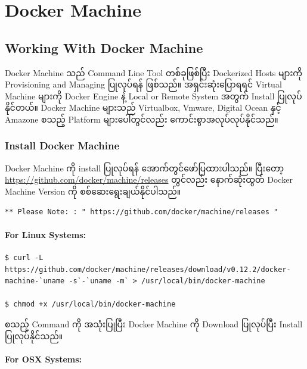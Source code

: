 \hypertarget{docker-machine}{%
\section{Docker Machine}\label{docker-machine}}

\hypertarget{working-with-docker-machine}{%
\subsection{Working With Docker
Machine}\label{working-with-docker-machine}}

Docker Machine သည် Command Line Tool တစ်ခုဖြစ်ပြီး Dockerized Hosts
များကို Provisioning and Managing ပြုလုပ်ရန် ဖြစ်သည်။ အရှင်းဆုံးပြောရရင်
Virtual Machine များကို Docker Engine နဲ့ Local or Remote System အတွက်
Install ပြုလုပ်နိုင်တယ်။ Docker Machine များသည် Virtualbox, Vmware,
Digital Ocean နှင့် Amazone စသည့် Platform များပေါ်တွင်လည်း
ကောင်းစွာအလုပ်လုပ်နိုင်သည်။

\hypertarget{install-docker-machine}{%
\subsubsection{Install Docker Machine}\label{install-docker-machine}}

Docker Machine ကို install ပြုလုပ်ရန် အောက်တွင်ဖော်ပြထားပါသည်။ ပြီးတော့
\url{https://github.com/docker/machine/releases} တွင်လည်း နောက်ဆုံးထွတ်
Docker Machine Version ကို စစ်ဆေးရွေးချယ်နိုင်ပါသည်။

\begin{verbatim}
** Please Note: : " https://github.com/docker/machine/releases " 
\end{verbatim}

\hypertarget{for-linux-systems}{%
\paragraph{For Linux Systems:}\label{for-linux-systems}}

\begin{verbatim}
$ curl -L https://github.com/docker/machine/releases/download/v0.12.2/docker-machine-`uname -s`-`uname -m` > /usr/local/bin/docker-machine

$ chmod +x /usr/local/bin/docker-machine
\end{verbatim}

စသည့် Command ကို အသုံးပြုပြီး Docker Machine ကို Download ပြုလုပ်ပြီး
Install ပြုလုပ်နိုင်သည်။

\hypertarget{for-osx-systems}{%
\paragraph{For OSX Systems:}\label{for-osx-systems}}

